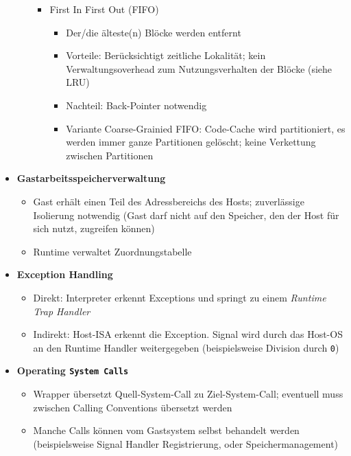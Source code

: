 \begin{itemize}
\begin{itemize}
\begin{itemize}
			\item First In First Out (FIFO)
			\begin{itemize}
				\item Der/die älteste(n) Blöcke werden entfernt
				\item Vorteile: Berücksichtigt zeitliche Lokalität; kein Verwaltungsoverhead zum Nutzungsverhalten der Blöcke (siehe LRU)
				\item Nachteil: Back-Pointer notwendig
				\item Variante Coarse-Grainied FIFO: Code-Cache wird partitioniert, es werden immer ganze Partitionen gelöscht; keine Verkettung zwischen Partitionen
			\end{itemize}
		\end{itemize}
	\end{itemize}
	\item \textbf{Gastarbeitsspeicherverwaltung}
	\begin{itemize}
		\item Gast erhält einen Teil des Adressbereichs des Hosts; zuverlässige Isolierung notwendig (Gast darf nicht auf den Speicher, den der Host für sich nutzt, zugreifen können)
		\item Runtime verwaltet Zuordnungstabelle
	\end{itemize}
	\item \textbf{Exception Handling}
	\begin{itemize}
		\item Direkt: Interpreter erkennt Exceptions und springt zu einem \textit{Runtime Trap Handler}
		\item Indirekt: Host-ISA erkennt die Exception. Signal wird durch das Host-OS an den Runtime Handler weitergegeben (beispielsweise Division durch \texttt{0})
	\end{itemize}
	\item \textbf{Operating \texttt{System Calls}}
	\begin{itemize}
		\item Wrapper übersetzt Quell-System-Call zu Ziel-System-Call; eventuell muss zwischen Calling Conventions übersetzt werden
		\item Manche Calls können vom Gastsystem selbst behandelt werden (beispielsweise Signal Handler Registrierung, oder Speichermanagement)
	\end{itemize}
\end{itemize}



